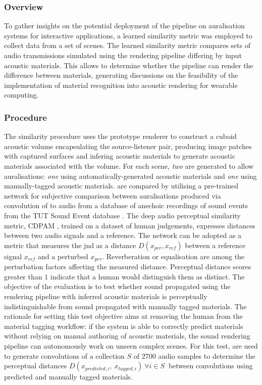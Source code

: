 \subsubsection{Overview}
To gather insights on the potential deployment of the pipeline on auralisation systems for interactive applications, a learned similarity metric was employed to collect data from a set of scenes. The learned similarity metric compares sets of audio transmissions simulated using the rendering pipeline differing by input acoustic materials. This allows to determine whether the pipeline can render the difference between materials, generating discussions on the feasibility of the implementation of material recognition into acoustic rendering for wearable computing. \par

\subsubsection{Procedure}
The similarity procedure uses the prototype renderer to construct a cuboid acoustic volume encapsulating the source-listener pair, producing image patches with captured surfaces and infering acoustic materials to generate acoustic materials associated with the volume. For each scene, \emph{two}  are generated to allow auralisations: \emph{one} using automatically-generated acoustic materials and \emph{one} using manually-tagged acoustic materials.  are compared by utilising a pre-trained network for subjective comparison between auralisations produced via convolution of  to audio from a database of anechoic recordings of sound events from the TUT Sound Event database \citep{sharath_adavanne_2018_1237752}. The deep audio perceptual similarity metric, CDPAM \citep{manocha2021cdpam}, trained on a dataset of human judgements, expresses distances between two audio signals and a reference. The network can be adopted as a metric that measures the \acrfull{jnd} as a distance $D(x_{per}, x_{ref})$ between a reference signal $x_{ref}$ and a perturbed $x_{per}$. Reverberation or equalisation are among the perturbation factors affecting the measured distance. Perceptual distance scores greater than $1$ indicate that a human would distinguish them as distinct. The objective of the evaluation is to test whether sound propagated using the rendering pipeline with inferred acoustic materials is perceptually indistinguishable from sound propagated with manually tagged materials. The rationale for setting this test objective aims at removing the human from the material tagging workflow: if the system is able to correctly predict materials without relying on manual authoring of acoustic materials, the sound rendering pipeline can autonomously work on unseen complex scenes. For this test,  are used to generate convolutions of a collection $S$ of 2700 audio samples to determine the perceptual distances $D(x_{predicted, i},~x_{tagged, i})~\forall i \in S~$ between convolutions using predicted and manually tagged materials.\par

